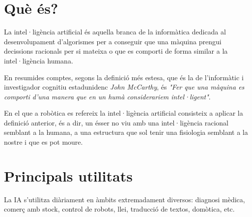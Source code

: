 \section{Què és?}

La intel·ligència artificial és aquella branca de la informàtica dedicada al
desenvolupament d'algorismes per a conseguir que una màquina prengui decissions
 racionals per si mateixa o que es comporti de forma similar a la intel·ligència humana.

En resumides comptes, segons la definició més estesa, que és la de l'informàtic i
investigador cognitiu estadunidenc \emph{John McCarthy}, és \emph{"Fer que una màquina
es comporti d'una manera que en un humà considerariem intel·ligent"}.

En el que a robòtica es refereix la intel·ligència artificial consisteix a aplicar la
definició anterior, és a dir, un ésser no viu amb una intel·ligència racional semblant
a la humana, a una estructura que sol tenir una fisiologia semblant a la nostre i que
es pot moure.
\cite{definiciondeia} \cite{wikiia} \cite{monoia}

\section{Principals utilitats}

La IA s'utilitza diàriament en àmbits extremadament diversos: diagnosi mèdica, comerç amb stock, control de robots, llei, traducció de textos, domòtica, etc.




